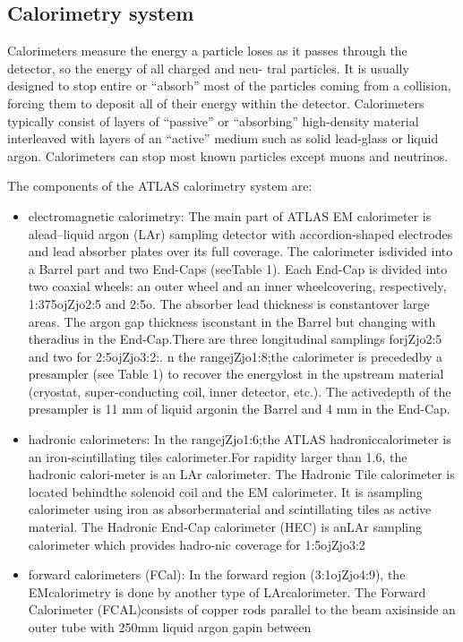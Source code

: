 \documentclass[a4paper, oneside]{book}
\begin{document}
			\subsection{Calorimetry system}
			Calorimeters measure the energy a particle loses as it passes through the detector, so the energy of all charged and neu-
			tral particles. It is usually designed to stop entire or “absorb” most of the particles coming from a collision, forcing them to deposit all of their energy within the detector. Calorimeters typically consist of layers of “passive” or “absorbing” high-density material interleaved with layers of an “active” medium such as solid lead-glass or liquid argon. Calorimeters can stop most known particles except muons and neutrinos.
			
			The components of the ATLAS calorimetry system are: \cite{Calorimetry}
			\begin{itemize}
				\item electromagnetic calorimetry:
				The main part of ATLAS EM calorimeter is alead–liquid argon (LAr) sampling detector with accordion-shaped electrodes and lead absorber plates over its full coverage. The calorimeter isdivided into a Barrel part and two End-Caps (seeTable 1). Each End-Cap is divided into two coaxial wheels: an outer wheel and an inner wheelcovering, respectively, 1:375ojZjo2:5 and 2:5o. The absorber lead thickness is constantover large areas. The argon gap thickness isconstant in the Barrel but changing with theradius in the End-Cap.There are three longitudinal samplings forjZjo2:5 and two for 2:5ojZjo3:2:. n the rangejZjo1:8;the calorimeter is precededby a presampler (see Table 1) to recover the energylost in the upstream material (cryostat, super-conducting coil, inner detector, etc.). The activedepth of the presampler is 11 mm of liquid argonin the Barrel and 4 mm in the End-Cap.
				\item hadronic calorimeters:
				In the rangejZjo1:6;the ATLAS hadroniccalorimeter is an iron-scintillating tiles calorimeter.For rapidity larger than 1.6, the hadronic calori-meter is an LAr calorimeter. The Hadronic Tile calorimeter is located behindthe solenoid coil and the EM calorimeter. It is asampling calorimeter using iron as absorbermaterial and scintillating tiles as active material. The Hadronic End-Cap calorimeter (HEC) is anLAr sampling calorimeter which provides hadro-nic coverage for 1:5ojZjo3:2
				\item forward calorimeters (FCal):
				In the forward region (3:1ojZjo4:9), the EMcalorimetry is done by another type of LArcalorimeter. The Forward Calorimeter (FCAL)consists of copper rods parallel to the beam axisinside an outer tube with 250mm liquid argon gapin between
			\end{itemize}
		
\end{document}
